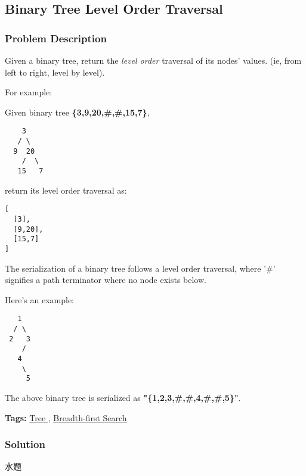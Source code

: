 \documentclass{article}
\begin{document}
\begin{CJK*}{UTF8}{gkai}
\subsection{ Binary Tree Level Order Traversal }
\label{ Binary Tree Level Order Traversal }

\subsubsection*{Problem Description}
Given a binary tree, return the \emph{level order} traversal of its nodes' values. (ie, from left to right, level by level).

For example:


Given binary tree \textbf{\{3,9,20,\#,\#,15,7\}},


\begin{verbatim}
    3
   / \
  9  20
    /  \
   15   7
\end{verbatim}

return its level order traversal as:


\begin{verbatim}
[
  [3],
  [9,20],
  [15,7]
]
\end{verbatim}

The serialization of a binary tree follows a level order traversal, where '\#' signifies a path terminator where no node exists below.

Here's an example:


\begin{verbatim}
   1
  / \
 2   3
    /
   4
    \
     5
\end{verbatim}
The above binary tree is serialized as \textbf{"\{1,2,3,\#,\#,4,\#,\#,5\}"}.


\textbf{Tags: }
\hyperref[ Tree ]{ Tree },  \hyperref[ Breadth-first Search ]{ Breadth-first Search }



\subsubsection*{Solution}
水题


\end{CJK*}
\end{document}
